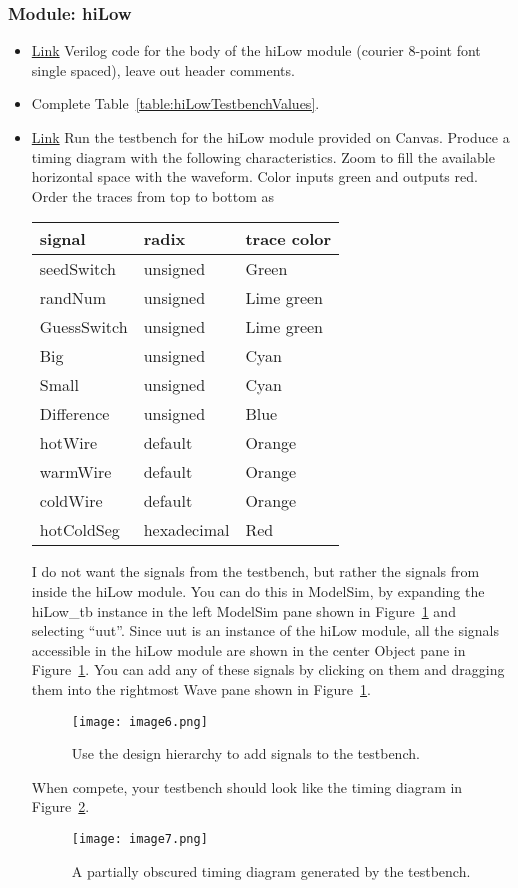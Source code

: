 \subsubsection{Module: hiLow}

\begin{itemize}
\item
  \protect\hyperlink{hilow-module}{Link} Verilog code for the body of
  the hiLow module (courier 8-point font single spaced), leave out
  header comments.
\item
  Complete Table~\ref{table:hiLowTestbenchValues}.
\item
  \protect\hyperlink{hilow_tb-module}{Link} Run the testbench for the
  hiLow module provided on Canvas. Produce a timing diagram with the
  following characteristics. Zoom to fill the available horizontal space
  with the waveform. Color inputs green and outputs red. Order the
  traces from top to bottom as

  \begin{tabular}{p{4cm}p{4cm}p{4cm}}
   signal & radix & trace color \\ \hline
    seedSwitch  &  unsigned & Green  \\
    randNum  &  unsigned  & Lime green  \\
    GuessSwitch  &  unsigned  & Lime green  \\
    Big   & unsigned &  Cyan  \\
    Small  &  unsigned &  Cyan  \\
    Difference  &  unsigned &  Blue  \\
    hotWire  & default &  Orange  \\
    warmWire  & default &  Orange  \\
    coldWire  & default &  Orange  \\
    hotColdSeg  & hexadecimal &  Red  \\
\end{tabular}

I do not want the signals from the testbench, but rather the signals
from inside the hiLow module. You can do this in ModelSim, by expanding
the hiLow\_tb instance in the left ModelSim pane shown in Figure~\ref{fig:hierarchyTestbench} and
selecting ``uut''. Since uut is an instance of the hiLow module, all the
signals accessible in the hiLow module are shown in the center Object
pane in Figure~\ref{fig:hierarchyTestbench}. You can add any of these signals by clicking on them
and dragging them into the rightmost Wave pane shown in Figure~\ref{fig:hierarchyTestbench}.

\begin{figure}[ht]
\texttt{[image:  image6.png]}
\caption{Use the design hierarchy to add signals to the testbench.}
\label{fig:hierarchyTestbench}
\end{figure}

When compete, your testbench should look like the timing diagram in
Figure~\ref{fig:guessTiming}.

\begin{figure}[ht]
\texttt{[image:  image7.png]}
\caption{A partially obscured timing diagram generated by the testbench.}
\label{fig:guessTiming}
\end{figure}
\end{itemize}

